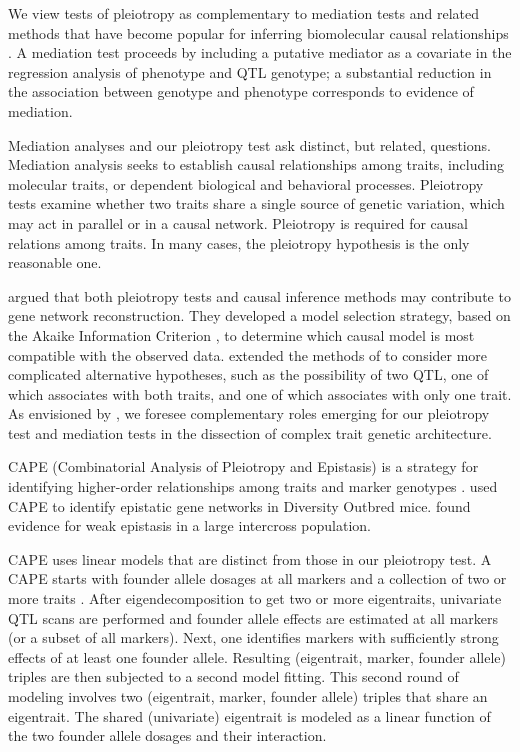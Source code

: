 \documentclass[oneside]{book}\usepackage[]{graphicx}\usepackage[]{color}
\begin{document}
We view tests of pleiotropy as complementary to 
mediation tests and related methods that have become popular for
inferring biomolecular causal relationships
\citep{chick2016defining,schadt2005integrative,baron1986moderator}. A
mediation test proceeds by including a putative mediator as a
covariate in the regression analysis of phenotype and QTL genotype;
a substantial reduction in the association between
genotype and phenotype corresponds to evidence of mediation. 


Mediation analyses and our pleiotropy test ask distinct, but related, questions. Mediation analysis seeks to establish causal relationships among traits, including molecular traits, or dependent biological and behavioral processes. Pleiotropy tests examine whether two traits share a single source of genetic variation, which may act in parallel or in a causal network. Pleiotropy is required for causal relations among traits. In many cases, the pleiotropy hypothesis is the only reasonable one. 

\citet{schadt2005integrative} argued that
both pleiotropy tests and causal inference methods may contribute to gene network
reconstruction. They developed a model selection strategy, based on
the Akaike Information Criterion \citep{akaike1974new}, to determine which
causal model is most compatible with the observed data.
\citet{schadt2005integrative} extended the methods of
\citet{jiang1995multiple} to consider more complicated alternative
hypotheses, such as the possibility of two QTL, one of which
associates with both traits, and one of which associates with only one
trait. As envisioned by \citet{schadt2005integrative}, we foresee
complementary roles emerging for our pleiotropy test
and mediation tests in the dissection of complex trait genetic
architecture.

CAPE (Combinatorial Analysis of Pleiotropy and Epistasis) is a strategy for identifying higher-order relationships among traits and marker genotypes \citep{tyler2013cape}. 
\citet{tyler2017epistatic} used CAPE to identify epistatic gene networks in Diversity Outbred mice. \citet{tyler2016weak} found evidence for weak epistasis in a large intercross population. 

CAPE uses linear models that are distinct from those in our pleiotropy test. 
A CAPE starts with founder allele dosages at all markers and a collection of two or more traits \citep{tyler2017epistatic}. 
After eigendecomposition to get two or more eigentraits, univariate QTL scans are performed and founder allele effects are estimated at all markers (or a subset of all markers). 
Next, one identifies markers with sufficiently strong effects of at least one founder allele. 
Resulting (eigentrait, marker, founder allele) triples are then subjected to a second model fitting. 
This second round of modeling involves two (eigentrait, marker, founder allele) triples that share an eigentrait. 
The shared (univariate) eigentrait is modeled as a linear function of the two founder allele dosages and their interaction. 
\end{document}

